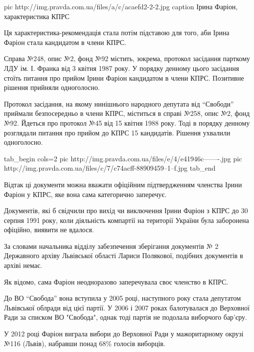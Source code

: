 \ifcmt
pic http://img.pravda.com.ua/files/a/c/acaefd2-2-2.jpg
caption Ірина Фаріон, характеристика КПРС
\fi

Ця характеристика-рекомендація стала потім підставою для того, аби Ірина Фаріон
стала кандидатом в члени КПРС. 

Справа №248, опис №2, фонд №92 містить, зокрема, протокол засідання парткому
ЛДУ ім. І. Франка від 3 квітня 1987 року. У порядку денному цього засідання
стоїть питання про прийом  Ірини Фаріон кандидатом в члени КПРС. Позитивне
рішення прийняли одноголосно.

Протокол засідання, на якому нинішнього народного депутата від \enquote{Свободи}
приймали безпосередньо в члени КПРС, міститься в справі №258, опис №2, фонд
№92. Йдеться про протокол №45 від 15 квітня 1988 року. Тоді в порядку денному
розглядали питання про прийом до КПРС 15 кандидатів. Рішення ухвалили
одноголосно.

\ifcmt
tab_begin cols=2
  pic http://img.pravda.com.ua/files/e/4/e41946c-------.jpg
  pic http://img.pravda.com.ua/files/c/7/c74acff-88909459--1--f.jpg
tab_end
\fi

Відтак ці документи можна вважати офіційним підтвердженням членства Ірини
Фаріон у КПРС, яке вона сама категорично заперечує.

Документів, які б свідчили про вихід чи виключення Ірини Фаріон з КПРС до 30
серпня 1991 року, коли діяльність компартії на території України була
заборонена офіційно, виявити не вдалося.

За словами начальника відділу забезпечення зберігання документів № 2 Державного
архіву Львівської області Лариси Полякової, подібних документів в архіві немає.

Як відомо, сама Фаріон неодноразово заперечувала своє членство в КПРС.

До ВО \enquote{Свобода} вона вступила у 2005 році, наступного року стала депутатом
Львівської облради від цієї партії. У 2006 і 2007 роках балотувалася до
Верховної Ради за списком ВО "Свобода", однак тоді партія не подолала виборчого
бар’єру.

У 2012 році Фаріон виграла вибори до Верховної Ради у мажоритарному окрузі №116
(Львів), набравши понад 68\% голосів виборців.
